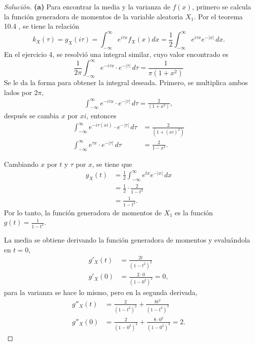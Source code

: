 \documentclass[12pt,letterpaper]{article}
\newcommand\integral[4]{\ensuremath{\int_{#1}^{#2} #3 \, d#4}}
\begin{document}
\begin{proof}[Solución]
\textbf{(a)} Para encontrar la media y la varianza de $f(x)$, primero se calcula la función generadora de momentos de la variable aleatoria $X_1$. Por el teorema 10.4 \cite{snell}, se tiene la relación
	\begin{equation}
		k_X (\tau) = g_X (i \tau) = \int_{-\infty}^{\infty} e^{i \tau x} f_X (x) dx =\frac{1}{2} \int_{-\infty}^{\infty} e^{i \tau x} e^{-|x|} \, dx.
	\end{equation}
En el ejercicio 4, se resolvió una integral similar, cuyo valor encontrado es
\begin{equation}
\frac{1}{2\pi} \integral{-\infty}{\infty}{e^{-i\tau x} \cdot e^{-|\tau|}}{\tau} = \frac{1}{\pi(1+x^2)}
\end{equation}
Se le da la forma para obtener la integral deseada. Primero, se multiplica ambos lados por $2\pi$,
\begin{align}
\integral{-\infty}{\infty}{e^{-i\tau x} \cdot e^{-|\tau|}}{\tau} = \frac{2}{(1+x^2)},
\end{align}
después se cambia $x$ por $xi$, entonces
\begin{align}
 \integral{-\infty}{\infty}{e^{-i\tau (xi)} \cdot e^{-|\tau|}}{\tau} &= \frac{2}{(1+(xi)^2)} \\
\integral{-\infty}{\infty}{e^{\tau x} \cdot e^{-|\tau|}}{\tau} &= \frac{2}{1-x^2} .
\end{align}

Cambiando $x$ por $t$ y $\tau$ por $x$, se tiene que  
\begin{align}
g_X(t) &= \frac{1}{2} \integral{-\infty}{\infty} {e^{tx} e^{-|x|}}{x}\\
&= \frac{1}{2}\cdot \frac{2}{1-t^2} \\ &=\frac{1}{1-t^2}. 
\end{align}
Por lo tanto, la función generadora de momentos de $X_1$ es la función $g(t)=\frac{1}{1-t^2}$.

La media se obtiene derivando la función generadora de momentos y evaluándola en $t=0$,
	\begin{align}
		g'_X(t) &= \frac{2t}{(1-t^2)^2} \\
		g'_X(0) &= \frac{2\cdot 0}{(1-0^2)^2} = 0,
	\end{align}
para la varianza se hace lo mismo, pero en la segunda derivada,
	\begin{align}
	g''_X(t) &= \frac{2}{(1-t^2)^2} + \frac{8t^2}{(1-t^2)^3} \\
	g''_X(0) &= \frac{2}{(1-0^2)^2} + \frac{8\cdot 0^2}{(1-0^2)^3} = 2. 
	\end{align}


\end{proof}
\end{document}
